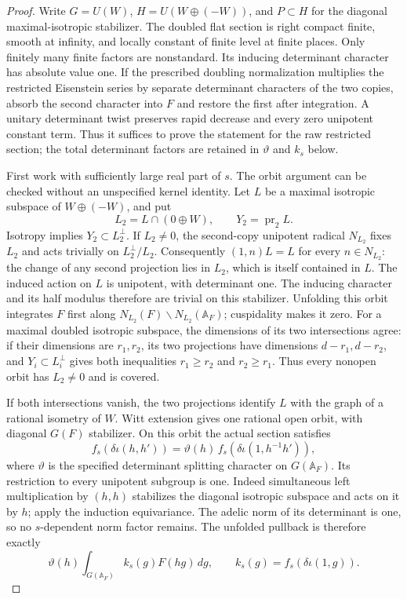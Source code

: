 \begin{proof}
Write \(G=U(W)\), \(H=U(W\oplus(-W))\), and \(P\subset H\)
for the diagonal maximal-isotropic stabilizer.
The doubled flat section is right compact finite, smooth at
infinity, and locally constant of finite level at finite places.
Only finitely many finite factors are nonstandard.
Its inducing determinant character has absolute value one.
If the prescribed doubling normalization multiplies the
restricted Eisenstein series by separate determinant
characters of the two copies, absorb the second character
into \(F\) and restore the first after integration.
A unitary determinant twist preserves rapid decrease and
every zero unipotent constant term. Thus it suffices to
prove the statement for the raw restricted section;
the total determinant factors are retained in
\(\vartheta\) and \(k_s\) below.

First work with sufficiently large real part of \(s\).
The orbit argument can be checked without an unspecified
kernel identity. Let \(L\) be a maximal isotropic subspace of
\(W\oplus(-W)\), and put
\[
 L_2=L\cap(0\oplus W),\qquad Y_2=\operatorname{pr}_2 L .
\]
Isotropy implies \(Y_2\subset L_2^\perp\).
If \(L_2\ne0\), the second-copy unipotent radical
\(N_{L_2}\) fixes \(L_2\) and acts trivially on
\(L_2^\perp/L_2\). Consequently
\((1,n)L=L\) for every \(n\in N_{L_2}\):
the change of any second projection lies in \(L_2\),
which is itself contained in \(L\).
The induced action on \(L\) is unipotent, with determinant one.
The inducing character and its half modulus therefore are
trivial on this stabilizer. Unfolding this orbit integrates
\(F\) first along
\(N_{L_2}(F)\backslash N_{L_2}(\mathbb A_F)\);
cuspidality makes it zero.
For a maximal doubled isotropic subspace, the dimensions of
its two intersections agree: if their dimensions are \(r_1,r_2\),
its two projections have dimensions \(d-r_1,d-r_2\), and
\(Y_i\subset L_i^\perp\) gives both inequalities
\(r_1\ge r_2\) and \(r_2\ge r_1\).
Thus every nonopen orbit has \(L_2\ne0\) and is covered.

If both intersections vanish, the two projections identify
\(L\) with the graph of a rational isometry of \(W\).
Witt extension gives one rational open orbit, with diagonal
\(G(F)\) stabilizer. On this orbit the actual section satisfies
\[
 f_s(\delta\iota(h,h'))
       =\vartheta(h)\,
                      f_s(\delta\iota(1,h^{-1}h')),
\]
where \(\vartheta\) is the specified determinant splitting
character on \(G(\mathbb A_F)\). Its restriction to every
unipotent subgroup is one. Indeed simultaneous left
multiplication by \((h,h)\) stabilizes the diagonal
isotropic subspace and acts on it by \(h\); apply the
induction equivariance. The adelic norm of its determinant
is one, so no \(s\)-dependent norm factor remains.
The unfolded pullback is therefore exactly
\[
       \vartheta(h)\int_{G(\mathbb A_F)}
                                k_s(g)F(hg)\,dg,\qquad
       k_s(g)=f_s(\delta\iota(1,g)).                \tag{O4}
 \label{eq:sr-theta-cusp-open-orbit}
\]


\end{proof}
